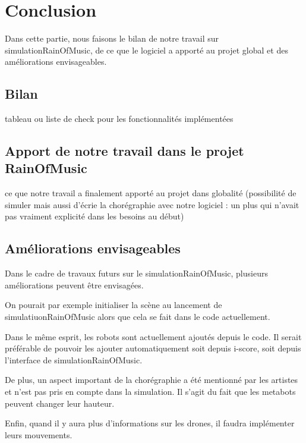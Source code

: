 \section{Conclusion}

Dans cette partie, nous faisons le bilan de notre travail sur simulationRainOfMusic, de ce que le logiciel a apporté au projet global et des améliorations envisageables.

\subsection{Bilan}

tableau ou liste de check pour les fonctionnalités implémentées

\subsection{Apport de notre travail dans le projet RainOfMusic}

ce que notre travail a finalement apporté au projet dans globalité (possibilité de simuler mais aussi d'écrie la chorégraphie avec notre logiciel : un plus qui n'avait pas vraiment explicité dans les besoins au début)

\subsection{Améliorations envisageables}

Dans le cadre de travaux futurs sur le simulationRainOfMusic, plusieurs améliorations peuvent être envisagées.

On pourait par exemple initialiser la scène au lancement de simulatiuonRainOfMusic alors que cela se fait dans le code actuellement.

Dans le même esprit, les robots sont actuellement ajoutés depuis le code. Il serait préférable de pouvoir les ajouter automatiquement soit depuis i-score, soit depuis l'interface de simulationRainOfMusic.  

De plus, un aspect important de la chorégraphie a été mentionné par les artistes et n'est pas pris en compte dans la simulation. Il s'agit du fait que les metabots peuvent changer leur hauteur.

Enfin, quand il y aura plus d'informations sur les drones, il faudra implémenter leurs mouvements. 


